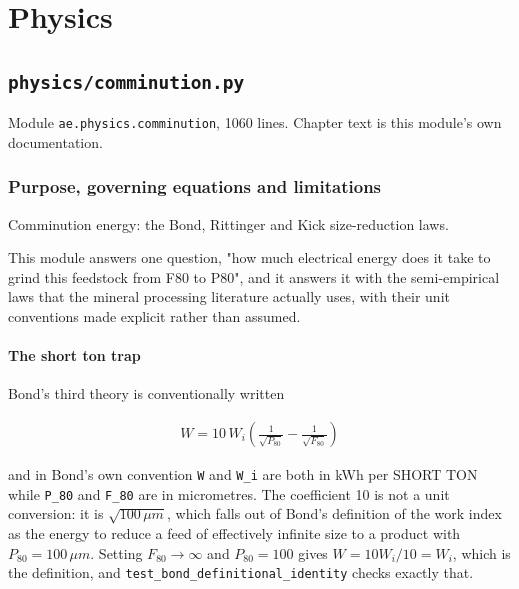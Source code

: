 \documentclass[10pt,a4paper,twoside]{report}
\newcommand{\theblurb}{}
\newcommand{\partblurb}[2]{%
  \renewcommand{\theblurb}{#2}%
  \part{#1}%
  \renewcommand{\theblurb}{}}
\begin{document}
\clearpage

\partblurb{Physics}{Unit-operation models. Each is a closed-form or low-dimensional numerical model of one physical mechanism, with its own validation status and its own stated limits.}

\chapter{\texttt{physics/comminution.py}}\label{ch:comminution}


{\footnotesize\color{slate}Module \texttt{ae.physics.comminution}, 1060 lines. Chapter text is this module's own documentation.\par}

\section{Purpose, governing equations and limitations}

Comminution energy: the Bond, Rittinger and Kick size-reduction laws.

This module answers one question, "how much electrical energy does it take to grind this feedstock from F80 to P80", and it answers it with the semi-empirical laws that the mineral processing literature actually uses, with their unit conventions made explicit rather than assumed.

\subsection*{The short ton trap}

Bond's third theory is conventionally written

\begin{equation*}
\begin{gathered}
W = 10\, W_i \left( \frac{1}{\sqrt{P_{80}}} - \frac{1}{\sqrt{F_{80}}} \right)
\end{gathered}
\end{equation*}

and in Bond's own convention \texttt{W} and \texttt{W\_i} are both in kWh per SHORT TON while \texttt{P\_80} and \texttt{F\_80} are in micrometres. The coefficient 10 is not a unit conversion: it is $\sqrt{100\,\mu m}$, which falls out of Bond's definition of the work index as the energy to reduce a feed of effectively infinite size to a product with $P_{80} = 100\,\mu m$. Setting $F_{80} \to \infty$ and $P_{80} = 100$ gives $W = 10 W_i / 10 = W_i$, which is the definition, and \texttt{test\_bond\_definitional\_identity} checks exactly that.
\end{document}
